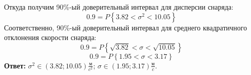 Откуда получим 90\%-ый доверительный интервал для дисперсии снаряда:
\begin{equation}
0.9 = P\left\{ 3.82 < \sigma^2 <10.05\right\}
\end{equation}
Соответственно, 90\%-ый доверительный интервал для среднего квадратичного отклонения скорости снаряда:
\begin{equation}
\nonumber 0.9 = P\left\{ \sqrt{3.82} < \sigma <\sqrt{10.05}\right\}
\end{equation}
\begin{equation}
0.9 = P\left\{ 1.95 < \sigma <3.17\right\}
\end{equation}
\textbf{Ответ:} $\sigma^2 \in (3.82;10.05) \frac{\text{м}}{c^2}$; $\sigma \in (1.95;3.17) \frac{\text{м}}{c}$. 